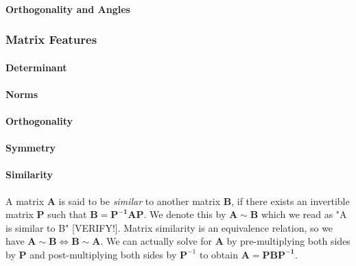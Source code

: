 \paragraph{Orthogonality and Angles}
% 

\subsubsection{Matrix Features}

\paragraph{Determinant}

\paragraph{Norms}

\paragraph{Orthogonality}

\paragraph{Symmetry}

\paragraph{Similarity}
A matrix $\mathbf{A}$ is said to be \emph{similar} to another matrix $\mathbf{B}$, if there exists an invertible matrix $\mathbf{P}$ such that $\mathbf{B} = \mathbf{P^{-1} A P}$. We denote this by $\mathbf{A} \sim \mathbf{B}$ which we read as "A is similar to B" [VERIFY!]. Matrix similarity is an equivalence relation, so we have $\mathbf{A} \sim \mathbf{B} \Leftrightarrow \mathbf{B} \sim \mathbf{A}$. We can actually solve for $\mathbf{A}$ by pre-multiplying both sides by $\mathbf{P}$ and post-multiplying both sides by $\mathbf{P}^{-1}$ to obtain $\mathbf{A} = \mathbf{P B P^{-1}}$. 



